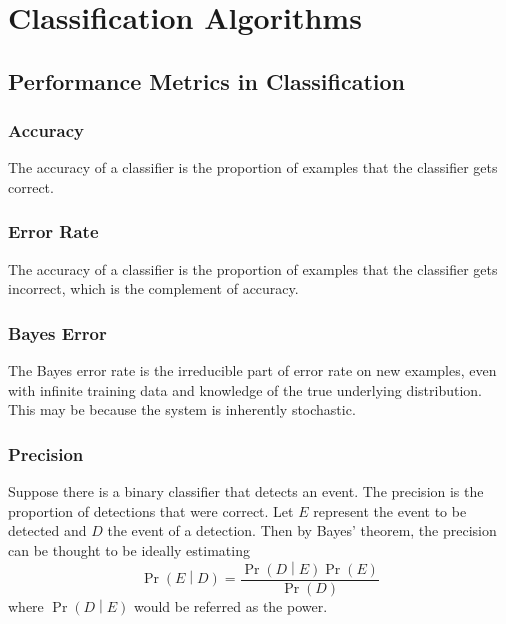 \documentclass[11pt]{report} %
\begin{document}
\section{Classification Algorithms}

\subsection{Performance Metrics in Classification \cite{Goodfellow2016}}

\subsubsection{Accuracy}

The accuracy of a classifier is the proportion of examples that the classifier gets correct.

\subsubsection{Error Rate}

The accuracy of a classifier is the proportion of examples that the classifier gets incorrect, which is the complement of accuracy.

\subsubsection{Bayes Error}

The Bayes error rate is the irreducible part of error rate on new examples, even with infinite training data and knowledge of the true underlying distribution. This may be because the system is inherently stochastic.

\subsubsection{Precision}

Suppose there is a binary classifier that detects an event. The precision is the proportion of detections that were correct. Let $E$ represent the event to be detected and $D$ the event of a detection. Then by Bayes' theorem, the precision can be thought to be ideally estimating
\begin{equation}
\operatorname{Pr}\left(E\middle|D\right) = \dfrac{\operatorname{Pr}\left(D\middle|E\right)\operatorname{Pr}\left(E\right)}{\operatorname{Pr}\left(D\right)}
\end{equation}
where $\operatorname{Pr}\left(D\middle|E\right)$ would be referred as the power.
\end{document}
